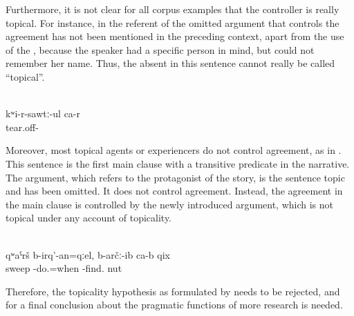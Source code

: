 Furthermore, it is not clear for all corpus examples that the controller is really topical. For instance, in  the referent of the omitted  argument that controls the agreement has not been mentioned in the preceding context, apart from the use of the , because the speaker had a specific person in mind, but could not remember her name. Thus, the absent  in this sentence cannot really be called ``topical''.
%
\begin{exe}
	\ex	{[To someone (= a woman whose name the speaker forgot) I said, well I will wash (my legs)]}\\	\label{ex:‎‎She takes (the jug) out of my hands (and washes my legs)}
	\gll	kʷi-r-sawtː-ul	ca-r\\
		tear.off-	\\
	\glt	{}
\end{exe}

Moreover, most topical agents or experiencers do not control  agreement, as in . This sentence is the first main clause with a transitive predicate in the narrative. The  argument, which refers to the protagonist of the story, is the sentence topic and has been omitted. It does not control agreement. Instead, the agreement in the main clause is controlled by the newly introduced  argument, which is not topical under any account of topicality.

\begin{exe}
	 \\ \label{ex:When she was sweeping, she found a walnut.} 
	\gll	qʷaˁrš	b-irq'-an=qːel,	b-arčː-ib	ca-b	qix\\
		sweep	-do.=when	-find.		nut\\
	\glt	{}
\end{exe}

Therefore, the topicality hypothesis as formulated by \citet{Sumbatova.Lander2014} needs to be rejected, and for a final conclusion about the pragmatic functions of  more research is needed.

